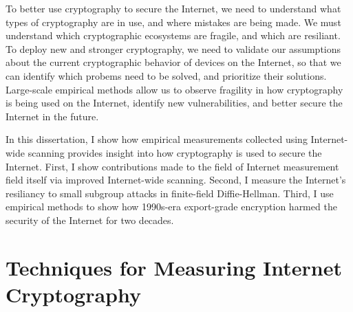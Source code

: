 To better use cryptography to secure the Internet, we need to understand what
types of cryptography are in use, and where mistakes are being made. We must
understand which cryptographic ecosystems are fragile, and which are
resiliant. To deploy new and stronger cryptography, we need to validate our
assumptions about the current cryptographic behavior of devices on the
Internet, so that we can identify which probems need to be solved, and
prioritize their solutions. Large-scale empirical methods allow us to observe
fragility in how cryptography is being used on the Internet, identify new
vulnerabilities, and better secure the Internet in the future.

In this dissertation, I show how empirical measurements collected using
Internet-wide scanning provides insight into how cryptography is used to
secure the Internet. First, I show contributions made to the field of
Internet measurement field itself via improved Internet-wide scanning.
Second, I measure the Internet's resiliancy to small subgroup attacks in
finite-field Diffie-Hellman. Third, I use empirical methods to show how
1990s-era export-grade encryption harmed the security of the Internet for two
decades.

\section{Techniques for Measuring Internet Cryptography}

